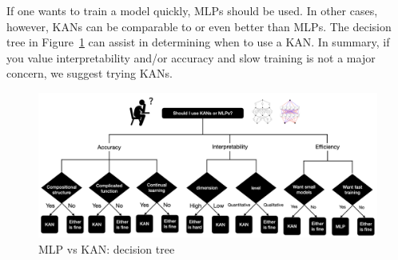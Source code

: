 If one wants to train a model quickly, MLPs should be used. In other cases, however, KANs can be comparable to or even better than MLPs. The decision tree in Figure~\ref{fig:dtree} can assist in determining when to use a KAN. In summary, if you value interpretability and/or accuracy and slow training is not a major concern, we suggest trying KANs.

\begin{figure}[H]
    \centering
    \includegraphics[width=0.75\linewidth]{LATEX//Images/MLP_KAN.png}
    \caption{MLP vs KAN: decision tree}
    \label{fig:dtree}
\end{figure}